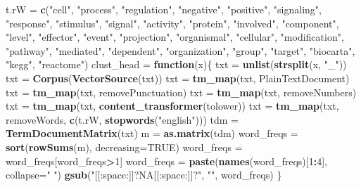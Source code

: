 \documentclass[9pt,a4paper,]{extarticle}
\newenvironment{Shaded}{\begin{snugshade}}{\end{snugshade}}
\newcommand{\KeywordTok}[1]{\textcolor[rgb]{0.13,0.29,0.53}{\textbf{#1}}}
\newcommand{\DataTypeTok}[1]{\textcolor[rgb]{0.13,0.29,0.53}{#1}}
\newcommand{\DecValTok}[1]{\textcolor[rgb]{0.00,0.00,0.81}{#1}}
\newcommand{\StringTok}[1]{\textcolor[rgb]{0.31,0.60,0.02}{#1}}
\newcommand{\OtherTok}[1]{\textcolor[rgb]{0.56,0.35,0.01}{#1}}
\newcommand{\ControlFlowTok}[1]{\textcolor[rgb]{0.13,0.29,0.53}{\textbf{#1}}}
\newcommand{\OperatorTok}[1]{\textcolor[rgb]{0.81,0.36,0.00}{\textbf{#1}}}
\newcommand{\NormalTok}[1]{#1}
\begin{document}
\begin{Shaded}
\begin{Highlighting}[]
\NormalTok{t.rW =}\StringTok{ }\KeywordTok{c}\NormalTok{(}\StringTok{"cell"}\NormalTok{, }\StringTok{"process"}\NormalTok{, }\StringTok{"regulation"}\NormalTok{, }\StringTok{"negative"}\NormalTok{, }\StringTok{"positive"}\NormalTok{, }\StringTok{"signaling"}\NormalTok{, }
         \StringTok{"response"}\NormalTok{, }\StringTok{"stimulus"}\NormalTok{, }\StringTok{"signal"}\NormalTok{, }\StringTok{"activity"}\NormalTok{, }\StringTok{"protein"}\NormalTok{, }\StringTok{"involved"}\NormalTok{, }
         \StringTok{"component"}\NormalTok{, }\StringTok{"level"}\NormalTok{, }\StringTok{"effector"}\NormalTok{, }\StringTok{"event"}\NormalTok{, }\StringTok{"projection"}\NormalTok{, }\StringTok{"organismal"}\NormalTok{, }
         \StringTok{"cellular"}\NormalTok{, }\StringTok{"modification"}\NormalTok{, }\StringTok{"pathway"}\NormalTok{, }\StringTok{"mediated"}\NormalTok{, }\StringTok{"dependent"}\NormalTok{, }
         \StringTok{"organization"}\NormalTok{, }\StringTok{"group"}\NormalTok{, }\StringTok{"target"}\NormalTok{, }\StringTok{"biocarta"}\NormalTok{, }\StringTok{"kegg"}\NormalTok{, }\StringTok{"reactome"}\NormalTok{)}
\NormalTok{clust_head =}\StringTok{ }\ControlFlowTok{function}\NormalTok{(x)\{}
\NormalTok{  txt =}\StringTok{ }\KeywordTok{unlist}\NormalTok{(}\KeywordTok{strsplit}\NormalTok{(x, }\StringTok{"_"}\NormalTok{))}
\NormalTok{  txt =}\StringTok{ }\KeywordTok{Corpus}\NormalTok{(}\KeywordTok{VectorSource}\NormalTok{(txt))}
\NormalTok{  txt =}\StringTok{ }\KeywordTok{tm_map}\NormalTok{(txt, PlainTextDocument)}
\NormalTok{  txt =}\StringTok{ }\KeywordTok{tm_map}\NormalTok{(txt, removePunctuation)}
\NormalTok{  txt =}\StringTok{ }\KeywordTok{tm_map}\NormalTok{(txt, removeNumbers)}
\NormalTok{  txt =}\StringTok{ }\KeywordTok{tm_map}\NormalTok{(txt, }\KeywordTok{content_transformer}\NormalTok{(tolower))}
\NormalTok{  txt =}\StringTok{ }\KeywordTok{tm_map}\NormalTok{(txt, removeWords, }\KeywordTok{c}\NormalTok{(t.rW, }\KeywordTok{stopwords}\NormalTok{(}\StringTok{"english"}\NormalTok{)))}
\NormalTok{  tdm =}\StringTok{ }\KeywordTok{TermDocumentMatrix}\NormalTok{(txt)}
\NormalTok{  m =}\StringTok{ }\KeywordTok{as.matrix}\NormalTok{(tdm)}
\NormalTok{  word_freqs =}\StringTok{ }\KeywordTok{sort}\NormalTok{(}\KeywordTok{rowSums}\NormalTok{(m), }\DataTypeTok{decreasing=}\OtherTok{TRUE}\NormalTok{) }
\NormalTok{  word_freqs =}\StringTok{ }\NormalTok{word_freqs[word_freqs}\OperatorTok{>}\DecValTok{1}\NormalTok{]}
\NormalTok{  word_freqs =}\StringTok{ }\KeywordTok{paste}\NormalTok{(}\KeywordTok{names}\NormalTok{(word_freqs)[}\DecValTok{1}\OperatorTok{:}\DecValTok{4}\NormalTok{], }\DataTypeTok{collapse=}\StringTok{" "}\NormalTok{)}
  \KeywordTok{gsub}\NormalTok{(}\StringTok{"[[:space:]]?NA[[:space:]]?"}\NormalTok{, }\StringTok{""}\NormalTok{, word_freqs)}
\NormalTok{\}}
\end{Highlighting}
\end{Shaded}
\end{document}
